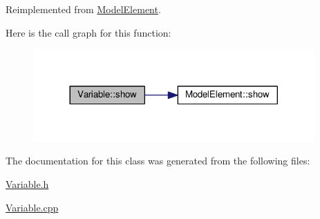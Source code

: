 Reimplemented from \hyperlink{class_model_element_af084d684e8effe5cd4c2265abc98896c}{Model\+Element}.



Here is the call graph for this function\+:\nopagebreak
\begin{figure}[H]
\begin{center}
\leavevmode
\includegraphics[width=305pt]{class_variable_a8bd0a772bb32fd630e252306306cd154_cgraph}
\end{center}
\end{figure}




The documentation for this class was generated from the following files\+:\begin{DoxyCompactItemize}
\item 
\hyperlink{_variable_8h}{Variable.\+h}\item 
\hyperlink{_variable_8cpp}{Variable.\+cpp}\end{DoxyCompactItemize}
